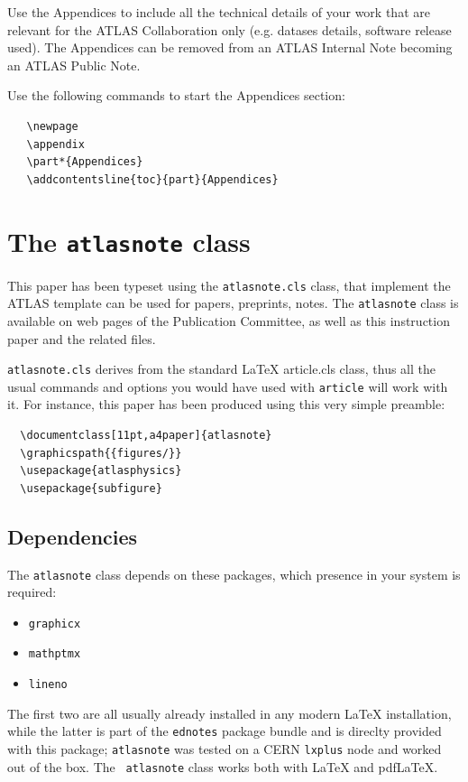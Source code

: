\documentclass[11pt,a4paper]{atlasnote}
\begin{document}
Use the Appendices to include all the technical details of your work
that are relevant for the ATLAS Collaboration only (e.g. datases
details, software release used). The Appendices can be removed from
an ATLAS Internal Note becoming an ATLAS Public Note.

Use the following commands to start the Appendices section:
\begin{verbatim}
   \newpage
   \appendix
   \part*{Appendices}
   \addcontentsline{toc}{part}{Appendices}
\end{verbatim}

\section{The {\tt atlasnote} class}
\label{app:AtlasNoteCls}

This paper has been typeset using the {\tt atlasnote.cls} class, that
implement the ATLAS template can be used for papers, preprints,
notes. The {\tt atlasnote} class is available on web pages of the
Publication Committee, as well as this instruction paper and the
related files.

{\tt atlasnote.cls} derives from the standard \LaTeX{} {article.cls}
class, thus all the usual commands and options you would have used
with {\tt article} will work with it. For instance, this paper has
been produced using this very simple preamble:

\begin{verbatim}
  \documentclass[11pt,a4paper]{atlasnote}
  \graphicspath{{figures/}}
  \usepackage{atlasphysics}
  \usepackage{subfigure}
\end{verbatim}

\subsection{Dependencies}

The {\tt atlasnote} class depends on these packages, which presence in
your system is required:
\begin{itemize}
  \item {\tt graphicx}
  \item {\tt mathptmx}
  \item {\tt lineno}
\end{itemize}
The first two are all usually already installed in any modern \LaTeX{}
installation, while the latter is part of the {\tt ednotes} package
bundle and is direclty provided with this package; {\tt atlasnote} was
tested on a CERN {\tt lxplus} node and worked out of the box. The {\tt
  atlasnote} class works both with \LaTeX{} and pdf\LaTeX{}.
\end{document}
